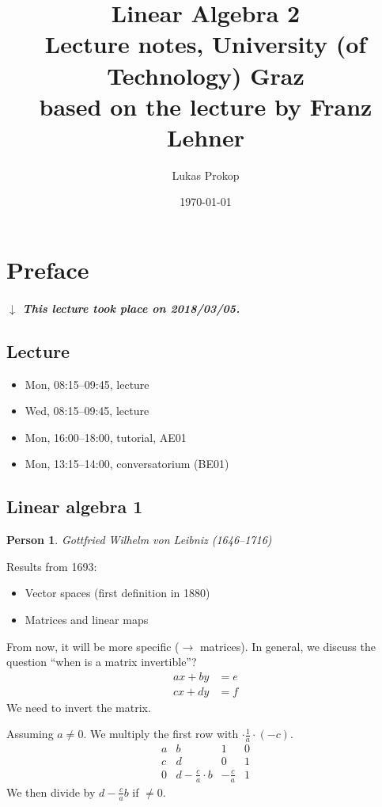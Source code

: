 \documentclass{article}
\title{
  Linear Algebra 2 \\
  \large{Lecture notes, University (of Technology) Graz} \\
  based on the lecture by Franz Lehner
}
\date{\today}
\author{Lukas Prokop}
\numberwithin{lecref}{section}
\newtheorem*{person}{Person}
\newcommand{\dateref}[1]{%
  \begin{mdframed}[backgroundcolor=gray!10,innerbottommargin=0pt,innertopmargin=0pt]
    \paragraph{\textit{$\downarrow$ This lecture took place on #1.}}%
  \end{mdframed}%
}
\begin{document}
\maketitle
\tableofcontents

\section{Preface}
\dateref{2018/03/05}

\subsection{Lecture}

\begin{itemize}
  \item Mon, 08:15--09:45, lecture
  \item Wed, 08:15--09:45, lecture
  \item Mon, 16:00--18:00, tutorial, AE01
  \item Mon, 13:15--14:00, conversatorium (BE01)
\end{itemize}

\subsection{Linear algebra 1}

\begin{person}
  Gottfried Wilhelm von Leibniz (1646--1716)
\end{person}
Results from 1693:
\begin{itemize}
  \item Vector spaces (first definition in 1880)
  \item Matrices and linear maps
\end{itemize}
From now, it will be more specific ($\rightarrow$ matrices).
In general, we discuss the question \enquote{when is a matrix invertible}?
\begin{align*}
  ax + by &= e \\
  cx + dy &= f
\end{align*}
We need to invert the matrix.

Assuming $a \neq 0$. We multiply the first row with $\cdot \frac1a \cdot (-c)$.
\[
  \begin{array}{cc|cc}
    a & b & 1 & 0 \\
    c & d & 0 & 1 \\
  \hline
    0 & d-\frac ca \cdot b & -\frac ca & 1
  \end{array}
\]
We then divide by $d - \frac ca b$ if $\neq 0$.
\end{document}
